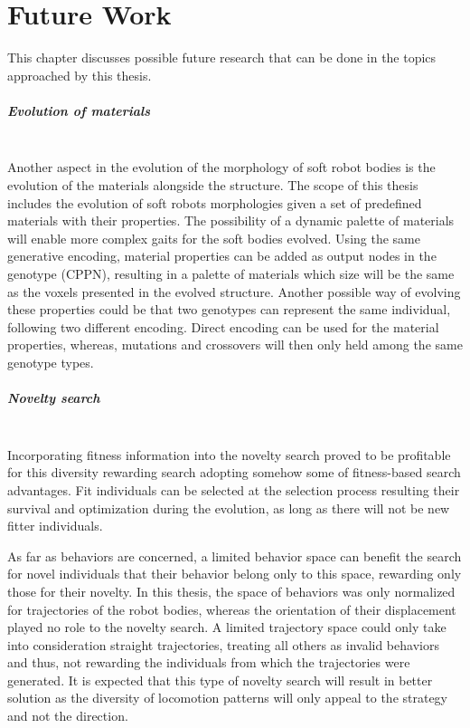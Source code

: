 
\chapter{Future Work} %

\label{Future Work} %


This chapter discusses possible future research that can be done in the topics approached by this thesis.

\paragraph*{Evolution of materials}~\\
Another aspect in the evolution of the morphology of soft robot bodies is the evolution of the materials alongside the structure. The scope of this thesis includes the evolution of soft robots morphologies given a set of predefined materials with their properties. The possibility of a dynamic palette of materials will enable more complex gaits for the soft bodies evolved. Using the same generative encoding, material properties can be added as output nodes in the genotype (CPPN), resulting in a palette of materials which size will be the same as the voxels presented in the evolved structure. Another possible way of evolving these properties could be that two genotypes can represent the same individual, following two different encoding. Direct encoding can be used for the material properties, whereas, mutations and crossovers will then only held among the same genotype types.

\paragraph*{Novelty search}~\\
Incorporating fitness information into the novelty search proved to be profitable for this diversity rewarding search adopting somehow some of fitness-based search advantages. Fit individuals can be selected at the selection process resulting their survival and optimization during the evolution, as long as there will not be new fitter individuals.

As far as behaviors are concerned, a limited behavior space can benefit the search for novel individuals that their behavior belong only to this space, rewarding only those for their novelty. In this thesis, the space of behaviors was only normalized for trajectories of the robot bodies, whereas the orientation of their displacement played no role to the novelty search. A limited trajectory space could only take into consideration straight trajectories, treating all others as invalid behaviors and thus, not rewarding the individuals from which the trajectories were generated. It is expected that this type of novelty search will result in better solution as the diversity of locomotion patterns will only appeal to the strategy and not the direction.
